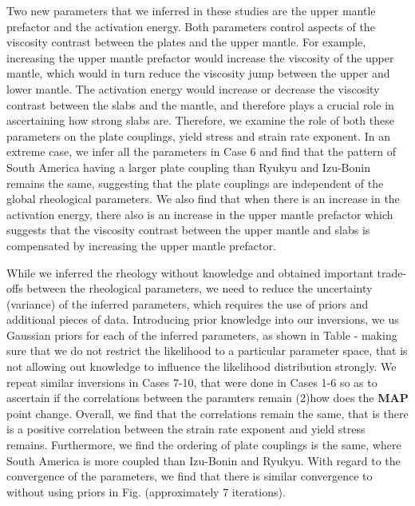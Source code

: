 \documentclass[12pt]{article}
\begin{document}
{Two new parameters that we inferred in these studies are the upper mantle prefactor and the activation energy. Both parameters control aspects of the viscosity contrast between the plates and the upper mantle. For example, increasing the upper mantle prefactor would increase the viscosity of the upper mantle, which would in turn reduce the viscosity jump between the upper and lower mantle. The activation energy would increase or decrease the viscosity contrast between the slabs and the mantle, and therefore plays a crucial role in ascertaining how strong slabs are.  Therefore, we examine the role of both these parameters on the plate couplings, yield stress and strain rate exponent. In an extreme case, we infer all the parameters in Case 6 and find that the pattern of South America having a larger plate coupling than Ryukyu and Izu-Bonin remains the same, suggesting that the plate couplings are independent of the global rheological parameters. We also find that when there is an increase in the activation energy, there also is an increase in the upper mantle prefactor which suggests that the viscosity contrast between the upper mantle and slabs is compensated by increasing the upper mantle prefactor. 

While we inferred the rheology without knowledge and obtained important trade-offs between the rheological parameters, we need to reduce the uncertainty (variance) of the inferred parameters, which requires the use of priors and additional pieces of data. Introducing prior knowledge into our inversions, we us Gaussian priors for each of the inferred parameters, as shown in Table - making sure that we do not restrict the likelihood to a particular parameter space, that is not allowing out knowledge to influence the likelihood distribution strongly.  We repeat similar inversions in Cases 7-10, that were done in Cases 1-6 so as to ascertain if the correlations between the paramters remain (2)how does the \textbf{MAP} point change. Overall, we find that the correlations remain the same, that is there is a positive correlation between the strain rate exponent and yield stress remains. Furthermore, we find the ordering of plate couplings is the same, where South America is more coupled than Izu-Bonin and Ryukyu. With regard to the convergence of the parameters, we find that there is similar convergence to without using priors in Fig. (approximately 7 iterations).

}
\end{document}
